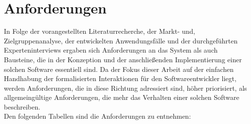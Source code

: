 \section{Anforderungen}
\label{sec:requirementsFinal}
    In Folge der vorangestellten Literaturrecherche, der Markt- und, Zielgruppenanalyse, der entwickelten Anwendungsfälle und 
    der durchgeführten Experteninterviews ergaben sich Anforderungen an das System als auch Bausteine, die in der 
    Konzeption und der anschließenden Implementierung einer solchen Software essentiell sind. Da der Fokus dieser 
    Arbeit auf der einfachen Handhabung der formalisierten Interaktionen für den Softwareentwickler liegt, werden 
    Anforderungen, die in diese Richtung adressiert sind, höher priorisiert, als allgemeingültige Anforderungen, die mehr das 
    Verhalten einer solchen Software beschreiben. 
    \\
    Den folgenden Tabellen sind die Anforderungen zu entnehmen:
